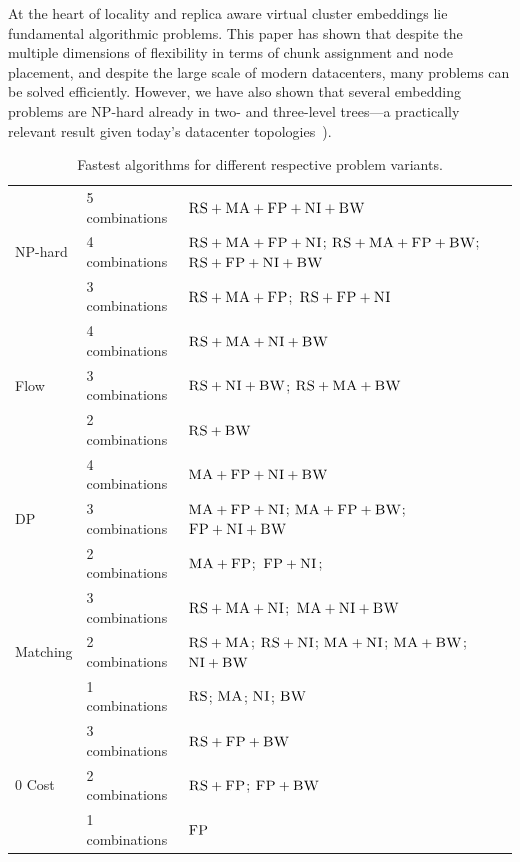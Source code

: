 \documentclass[conference,10pt]{IEEEtran}
\newcommand{\CC}{\textsc{NI}}
\newcommand{\FP}{\textsc{FP}}
\newcommand{\RS}{\textsc{RS}}
\newcommand{\BW}{\textsc{BW}}
\newcommand{\MA}{\textsc{MA}}
\begin{document}
At the heart of locality and replica aware virtual cluster embeddings lie fundamental algorithmic problems.
This paper has shown that despite the
multiple dimensions of flexibility in terms of chunk assignment and node placement, 
and despite the large scale of modern datacenters, 
many problems can be solved efficiently. However, we have also
shown that several embedding problems are NP-hard already in two-
and three-level trees---a practically relevant result given today's datacenter topologies~\cite{fattree}).
\begin{table}
\tiny
\bgroup
\def\arraystretch{1.5}
\begin{small}
\begin{tabular}{|l|l|p{4.5cm}|}
\hline
\multirow{3}{*}{NP-hard} & 5 combinations & \mbox{$\RS+\MA+\FP+\CC+\BW$}\\
\cline{2-3}
 & 4 combinations &  \mbox{$\RS+\MA+\FP+\CC$}; \mbox{$\RS+\MA+\FP+\BW$};
\mbox{$\RS+\FP+\CC+\BW$} \\ \cline{2-3}
 & 3 combinations &\mbox{$\RS+\MA+\FP$};~\mbox{$\RS+\FP+\CC$} \\
 \hline
 \hline
\multirow{3}{*}{Flow} & 4 combinations & \mbox{$\RS+\MA+\CC+\BW$} \\ \cline{2-3}
 & 3 combinations & \mbox{$\RS+\CC+\BW$}; \mbox{$\RS+\MA+\BW$}    \\ \cline{2-3}
 & 2 combinations &$\RS+\BW$ \\
 \hline
 \hline
\multirow{3}{*}{DP} & 4 combinations & \mbox{$\MA+\FP+\CC+\BW$} \\ \cline{2-3}
 & 3 combinations &   \mbox{$\MA+\FP+\CC$};
\mbox{$\MA+\FP+\BW$}; \mbox{$\FP+\CC+\BW$} \\ \cline{2-3}
 & 2 combinations & \mbox{$\MA+\FP$};~\mbox{$\FP+\CC$}; \\
 \hline
 \hline
\multirow{3}{*}{Matching} &3 combinations&
\mbox{$\RS+\MA+\CC$};~\mbox{$\MA+\CC+\BW$}  \\
\cline{2-3}
 & 2 combinations & \mbox{$\RS+\MA$};
\mbox{$\RS+\CC$}; \mbox{$\MA+\CC$};
\mbox{$\MA+\BW$}; \mbox{$\CC+\BW$} \\ \cline{2-3}
& 1 combinations & \mbox{$\RS$}; \mbox{$\MA$};
\mbox{$\CC$}; \mbox{$\BW$}\\
 \hline
 \hline
 \multirow{3}{*}{0 Cost} & 3 combinations & \mbox{$\RS+\FP+\BW$}\\
\cline{2-3}
 & 2 combinations & \mbox{$\RS+\FP$}; \mbox{$\FP+\BW$}\\ \cline{2-3}
 & 1 combinations & \mbox{$\FP$}\\
 \hline
\end{tabular}
\end{small}
\caption{
Fastest algorithms for different respective problem variants.
}
\vspace{-2em}
\label{tab:summary}
\egroup
\end{table}
\end{document}
